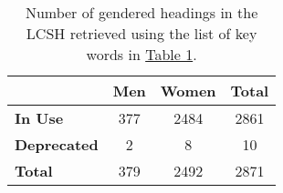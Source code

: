 \begin{table}
	\caption{Number of gendered headings in the LCSH retrieved using the list of key words in \hyperref[tab:gendered-words]{Table 1}.}
	\begin{center}
		\begin{tabular}{lccc}
			\toprule
			~ & \textbf{Men} & \textbf{Women} & \textbf{Total} \\
			\midrule
			\textbf{In Use} & 377 & 2484 & 2861 \\
			\textbf{Deprecated} & 2 & 8 & 10 \\
			\textbf{Total} & 379 & 2492 & 2871 \\
			\bottomrule
		\end{tabular}
	\end{center}
	\label{tab:term-counts}
\end{table}